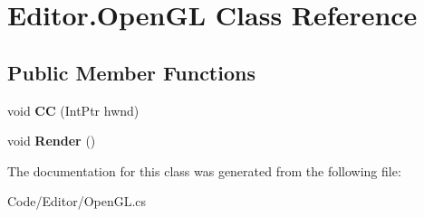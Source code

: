 \hypertarget{class_editor_1_1_open_g_l}{}\section{Editor.\+Open\+GL Class Reference}
\label{class_editor_1_1_open_g_l}
\subsection*{Public Member Functions}
\begin{DoxyCompactItemize}
\item 
void {\bfseries CC} (Int\+Ptr hwnd)\hypertarget{class_editor_1_1_open_g_l_a8d3f6ea5e8944a3f0a6f62b66f8167af}{}\label{class_editor_1_1_open_g_l_a8d3f6ea5e8944a3f0a6f62b66f8167af}

\item 
void {\bfseries Render} ()\hypertarget{class_editor_1_1_open_g_l_a125f7fe6e9df02ef83d985e5d92f8936}{}\label{class_editor_1_1_open_g_l_a125f7fe6e9df02ef83d985e5d92f8936}

\end{DoxyCompactItemize}


The documentation for this class was generated from the following file\+:\begin{DoxyCompactItemize}
\item 
Code/\+Editor/Open\+G\+L.\+cs\end{DoxyCompactItemize}
